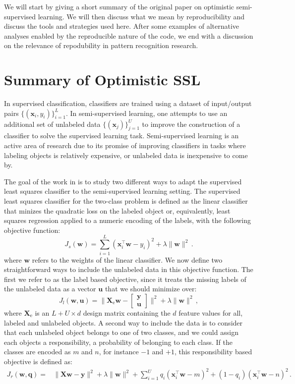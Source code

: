 \documentclass[runningheads,a4paper]{llncs}\usepackage[]{graphicx}\usepackage[]{color}
\newcommand{\Xe}{\mathbf{X}_\textrm{e}}
\begin{document}
We will start by giving a short summary of the original paper on optimistic semi-supervised learning. We will then discuss what we mean by reproducibility and discuss the tools and strategies used here. After some examples of alternative analyses enabled by the reproducible nature of the code, we end with a discussion on the relevance of repodubility in pattern recognition research.

\section{Summary of Optimistic SSL}
In supervised classification, classifiers are trained using a dataset of input/output pairs $\{(\mathbf{x}_i,y_i)\}^L_{i=1}$. In semi-supervised learning, one attempts to use an additional set of unlabeled data $\{(\mathbf{x}_j)\}^U_{j=1}$ to improve the construction of a classifier to solve the supervised learning task. Semi-supervised learning is an active area of research due to its promise of improving classifiers in tasks where labeling objects is relatively expensive, or unlabeled data is inexpensive to come by.

The goal of the work in \cite{Krijthe2016a} is to study two different ways to adapt the supervised least squares classifier to the semi-supervised learning setting. The supervised least squares classifier for the two-class problem is defined as the linear classifier that minizes the quadratic loss on the labeled object or, equivalently, least squares regression applied to a numeric encoding of the labels, with the following objective function:
\begin{equation}
J_s(\mathbf{w}) = \sum_{i=1}^L (\mathbf{x}_i^\top \mathbf{w}-y_i)^2 + \lambda \|\mathbf{w} \|^2 \,. \label{eq:supervisedobjective}
\end{equation}
where $\mathbf{w}$ refers to the weights of the linear classifier. We now define two straightforward ways to include the unlabeled data in this objective function. The first we refer to as the label based objective, since it treats the missing labels of the unlabeled data as a vector $\mathbf{u}$ that we should minimize over:
$$
J_l(\mathbf{w},\mathbf{u}) = \| \Xe \mathbf{w}-\begin{bmatrix} \mathbf{y} \\ \mathbf{u} \end{bmatrix} \|^2 + \lambda \|\mathbf{w} \|^2 \,,
$$
where $\Xe$ is an $L+U \times d$ design matrix containing the $d$ feature values for all, labeled and unlabeled objects.
A second way to include the data is to consider that each unlabeled object belongs to one of two classes, and we could assign each objects a responsibility, a probability of belonging to each class. If the classes are encoded as $m$ and $n$, for instance $-1$ and $+1$, this responsibility based objective is defined as:
\begin{align}
J_r(\mathbf{w},\mathbf{q}) = & \| \mathbf{X} \mathbf{w}-\mathbf{y} \|^2 + \lambda \|\mathbf{w} \|^2 \nonumber + \sum_{i=1}^{U}  q_i (\mathbf{x}_i^\top \mathbf{w} - m)^2  + (1-q_i) (\mathbf{x}_i^\top \mathbf{w} - n)^2 \,. \nonumber
\end{align}
\end{document}
